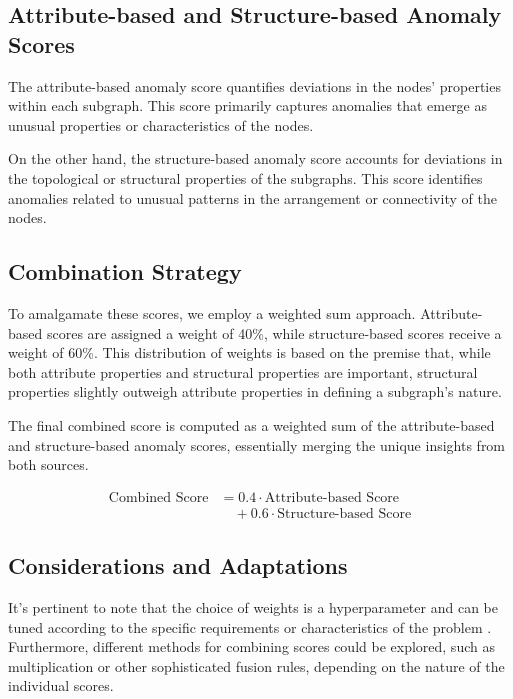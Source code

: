 \documentclass[10pt,twocolumn,a4paper]{article}
\begin{document}
\subsection{Attribute-based and Structure-based Anomaly Scores}

The attribute-based anomaly score quantifies deviations in the nodes' properties within each subgraph. This score primarily captures anomalies that emerge as unusual properties or characteristics of the nodes. 

On the other hand, the structure-based anomaly score accounts for deviations in the topological or structural properties of the subgraphs. This score identifies anomalies related to unusual patterns in the arrangement or connectivity of the nodes.

\subsection{Combination Strategy}

To amalgamate these scores, we employ a weighted sum approach. Attribute-based scores are assigned a weight of 40\%, while structure-based scores receive a weight of 60\%. This distribution of weights is based on the premise that, while both attribute properties and structural properties are important, structural properties slightly outweigh attribute properties in defining a subgraph's nature.

The final combined score is computed as a weighted sum of the attribute-based and structure-based anomaly scores, essentially merging the unique insights from both sources.



\begin{equation}
\begin{aligned}
\text{Combined Score}
&= 0.4 \cdot \text{Attribute-based Score} \\
&\quad + 0.6 \cdot \text{Structure-based Score}
\end{aligned}
\end{equation}



\subsection{Considerations and Adaptations}

It's pertinent to note that the choice of weights is a hyperparameter and can be tuned according to the specific requirements or characteristics of the problem \cite{victordaniel2025optimization}. Furthermore, different methods for combining scores could be explored, such as multiplication or other sophisticated fusion rules, depending on the nature of the individual scores.
\end{document}
